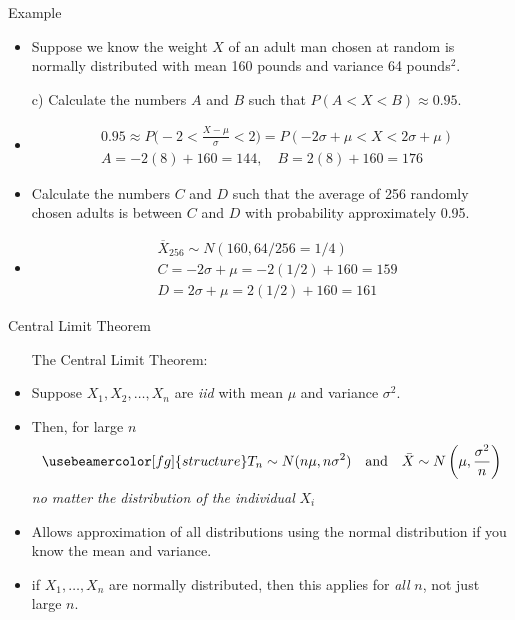 \documentclass[10pt, handout, xcolor=table]{beamer}
\newcommand*\themecol{\usebeamercolor[fg]{structure}}
\begin{document}
\begin{frame}{Example}
\begin{itemize}
\item Suppose we know the weight $X$ of an adult man chosen at random is normally distributed with mean 160 pounds and variance 64 pounds$^2$. \\[10pt]
\item[c)] Calculate the numbers $A$ and $B$ such that $P(A < X < B) \approx 0.95$.
\item<2->[] {\color{red} 
\vspace*{-0.25cm}
\begin{align*}
&0.95 \approx P\bigg(-2 < \frac{X-\mu}{\sigma} < 2\bigg) = P(-2\sigma + \mu < X < 2\sigma + \mu) \\
&A = -2(8) + 160 = 144,  \quad B = 2(8) + 160 = 176
\end{align*}}
\vspace*{-0.25cm}
\item<3->[d)] Calculate the numbers $C$ and $D$ such that the average of 256 randomly chosen adults is between $C$ and $D$ with probability approximately 0.95.
\item<4->[] {\color{red}
\vspace*{-0.5cm}
\begin{align*}
&\overline{X}_{256} \sim N(160, 64/256 = 1/4) \\
&C = -2\sigma + \mu = -2(1/2) + 160 = 159 \\
&D = 2\sigma + \mu = 2(1/2) + 160 = 161
\end{align*}}
\vspace*{-0.25cm}
\end{itemize}
\end{frame}

\begin{frame}{Central Limit Theorem}
\begin{itemize}
\setlength{\itemsep}{15pt}
\item[] {\themecol The Central Limit Theorem:}
\item Suppose $X_1, X_2, \dots, X_n$ are \emph{iid} with mean $\mu$ and variance $\sigma^2$. 
\item Then, for large $n$
\begin{align*}
\themecol T_n \sim N(n\mu, n\sigma^2)\quad \text{and} \quad \bar{X} \sim N\left(\mu, \frac{\sigma^2}{n}\right)
\end{align*}
{\centering \emph{no matter the distribution of the individual} $X_i$}
\item Allows approximation of all distributions using the normal distribution if you know the mean and variance.
\item<2->[Note:] \small if $X_1, \dots, X_n$ are normally distributed, then this applies for \emph{all} $n$, not just large $n$.
\end{itemize}
\end{frame}
\end{document}
